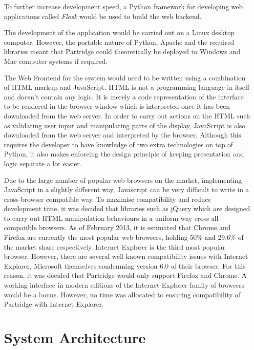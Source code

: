 To further increase development speed, a Python framework for developing web
applications called \emph{Flask\cite{flask2012}} would be used to build the web
backend.

The development of the application would be carried out on a Linux desktop
computer. However, the portable nature of Python, Apache and the required
libraries meant that Partridge could theoretically be deployed to Windows and
Mac computer systems if required.

The Web Frontend for the system would need to be written using a combination of
HTML markup and JavaScript. HTML is not a programming language in itself and
doesn't contain any logic. It is merely a code representation of the interface
to be rendered in the browser window which is interpreted once it has been
downloaded from the web server. In order to carry out actions on the HTML such
as validating user input and manipulating parts of the display, JavaScript is
also downloaded from the web server and interpreted by the browser. Although
this requires the developer to have knowledge of two extra technologies on top
of Python, it also makes enforcing the design principle of keeping presentation
and logic separate a lot easier.

Due to the large number of popular web browsers on the market, implementing
JavaScript in a slightly different way, Javascript can be very difficult to
write in a cross-browser compatible way.  To maximise compatibility and reduce
development time, it was decided that libraries such as jQuery which are
designed to carry out HTML manipulation behaviours in a uniform way cross all
compatible browsers.  As of February 2013, it is estimated that Chrome and
Firefox are currently the most popular web browsers, holding 50\% and 29.6\% of
the market share respectively\cite{browserstats2013}. Internet Explorer is the
third most popular browser. However, there are several well known compatibility
issues with Internet Explorer, Microsoft themselves condemning version 6.0 of
their browser\cite{ie6death}. For this reason, it was decided that Partridge
would only support Firefox and Chrome. A working interface in modern editions
of the Internet Explorer family of browsers would be a bonus.  However, no time
was allocated to ensuring compatibility of Partridge with Internet Explorer.

\section{ System Architecture }


